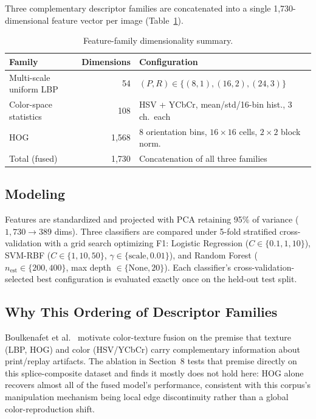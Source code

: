 \documentclass[11pt]{article}
\begin{document}
Three complementary descriptor families are concatenated into a single 1,730-dimensional feature vector per image (Table~\ref{tab:featuredims}).

\begin{table}[htbp]
\centering
\caption{Feature-family dimensionality summary.}
\label{tab:featuredims}
\begin{tabular}{lrl}
\toprule
Family & Dimensions & Configuration \\
\midrule
Multi-scale uniform LBP & 54 & $(P,R)\in\{(8,1),(16,2),(24,3)\}$ \\
Color-space statistics & 108 & HSV + YCbCr, mean/std/16-bin hist., 3 ch.\ each \\
HOG & 1,568 & 8 orientation bins, $16\times16$ cells, $2\times2$ block norm. \\
\midrule
Total (fused) & 1,730 & Concatenation of all three families \\
\bottomrule
\end{tabular}
\end{table}

\subsection{Modeling}

Features are standardized and projected with PCA retaining 95\% of variance ($1{,}730\to389$ dims). Three classifiers are compared under 5-fold stratified cross-validation with a grid search optimizing F1: Logistic Regression ($C\in\{0.1,1,10\}$), SVM-RBF ($C\in\{1,10,50\}$, $\gamma\in\{\text{scale},0.01\}$), and Random Forest ($n_{\text{est}}\in\{200,400\}$, max depth $\in\{\text{None},20\}$). Each classifier's cross-validation-selected best configuration is evaluated exactly once on the held-out test split.

\subsection{Why This Ordering of Descriptor Families}

Boulkenafet et al.~\cite{boulkenafet2015,boulkenafet2016} motivate color-texture fusion on the premise that texture (LBP, HOG) and color (HSV/YCbCr) carry complementary information about print/replay artifacts. The ablation in Section~8 tests that premise directly on this splice-composite dataset and finds it mostly does not hold here: HOG alone recovers almost all of the fused model's performance, consistent with this corpus's manipulation mechanism being local edge discontinuity rather than a global color-reproduction shift.
\end{document}
